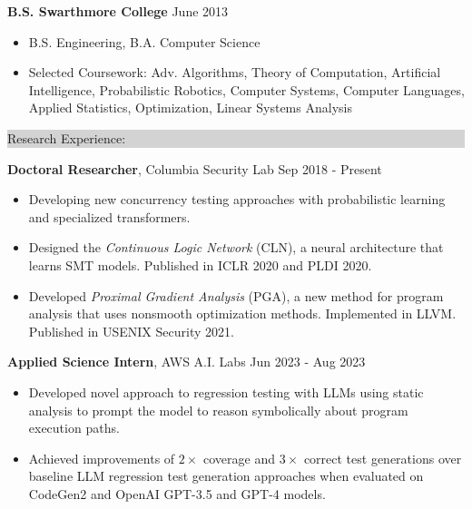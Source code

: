 \documentclass{article} %
\newcommand{\rsection}[1]{
  \hspace{-0.4cm}\vspace{0.1cm}
\colorbox{lightgrey}{
\begin{minipage}{1.07\linewidth}
\vspace{0.22cm}
\fontsize{14pt}{16pt}\selectfont #1
\vspace{0.12cm}
\end{minipage}
}
\vspace*{-0.1cm}
}
\newcommand{\rjob}[2]{
  \hspace*{-0.3cm}
{\fontsize{10pt}{12pt}\selectfont #1} \hfill #2
\vspace*{0.1cm}
\hspace*{-1.2cm}
}
\newenvironment{ritemize}{
\hspace*{-0.8cm}
\begin{minipage}{1.05\linewidth}
\begin{itemize}
}{
\end{itemize}
\end{minipage}
}
\newcommand{\ritem}{
\item[-]
}
\begin{document}
\rjob{\textbf{B.S. Swarthmore College}}{June 2013}\\
\begin{ritemize}
    \ritem B.S. Engineering, B.A. Computer Science %
\ritem Selected Coursework: Adv. Algorithms, Theory of Computation, Artificial Intelligence, Probabilistic Robotics, Computer Systems, Computer Languages, Applied Statistics, Optimization, Linear Systems Analysis
\end{ritemize}
\vspace{0.25cm}



\rsection{Research Experience:}


\rjob{\textbf{Doctoral Researcher}, Columbia Security Lab}{Sep 2018 - Present}\\
\begin{ritemize}
    \ritem Developing new concurrency testing approaches with probabilistic learning and specialized transformers.
    \ritem Designed the \textit{Continuous Logic Network} (CLN), a neural architecture that learns SMT models. Published in ICLR 2020 and PLDI 2020.
  \ritem Developed \textit{Proximal Gradient Analysis} (PGA), a new method for program analysis that uses nonsmooth optimization methods. Implemented in LLVM. Published in USENIX Security 2021.
\end{ritemize}


\rjob{\textbf{Applied Science Intern}, AWS A.I. Labs}{Jun 2023 - Aug 2023}\\
\begin{ritemize}
  \ritem Developed novel approach to regression testing with LLMs using static analysis to prompt the model to reason symbolically about program execution paths.
  \ritem Achieved improvements of $2\times$ coverage and $3\times$ correct test generations over baseline LLM regression test generation approaches when evaluated on CodeGen2 and OpenAI GPT-3.5 and GPT-4 models.
\end{ritemize}
\end{document}
